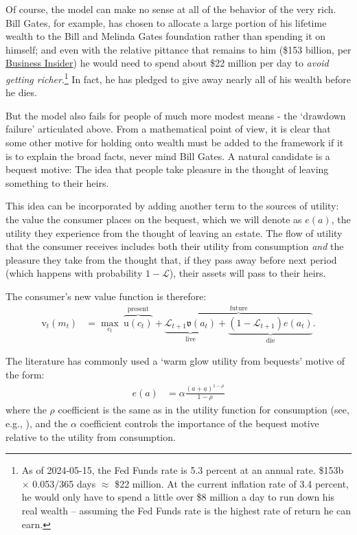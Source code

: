 \documentclass{article}
\newcommand{\CRRA}{\rho}
\newcommand{\uFunc}{\mathrm{u}}
\newcommand{\vFunc}{\mathrm{v}}
\newcommand{\Alive}{\mathcal{L}}
\newcommand{\cNrm}{c}
\newcommand{\aNrm}{a}
\newcommand{\mNrm}{m}
\newcommand{\bqstNrm}{e}
\begin{document}
Of course, the model can make no sense at all of the behavior of the very rich.
Bill Gates, for example, has chosen to allocate a large portion of his lifetime wealth to the Bill and Melinda Gates foundation rather than spending it on himself; and even with the relative pittance that remains to him (\$153 billion, per \href{https://www.businessinsider.com/how-bill-gates-spends-fortune}{Business Insider}) he would need to spend about \$22 million per day to \textit{avoid getting richer}.\footnote{As of 2024-05-15, the Fed Funds rate is 5.3 percent at an annual rate.
\$153b $\times$ 0.053/365 days $\approx$ \$22 million.
At the current inflation rate of 3.4 percent, he would only have to spend a little over \$8 million a day to run down his real wealth -- assuming the Fed Funds rate is the highest rate of return he can earn.}
In fact, he has pledged to give away nearly all of his wealth before he dies.

But the model also fails for people of much more modest means - the `drawdown failure' articulated above.
From a mathematical point of view, it is clear that some other motive for holding onto wealth must be added to the framework if it is to explain the broad facts, never mind Bill Gates.
A natural candidate is a bequest motive: The idea that people take pleasure in the thought of leaving something to their heirs.

This idea can be incorporated by adding another term to the sources of utility: the value the consumer places on the bequest, which we will denote as $\bqstNrm(\aNrm)$, the utility they experience from the thought of leaving an $\bqstNrm$state.
The flow of utility that the consumer receives includes both their utility from consumption \textit{and} the pleasure they take from the thought that, if they pass away before next period (which happens with probability $1 -\Alive$), their assets will pass to their heirs.

The consumer's new value function is therefore:
\begin{align}
    {\vFunc}_{t}({\mNrm}_{t}) & = \max_{\cNrm_{t}} ~ \overbrace{\uFunc(\cNrm_{t})}^{\text{present}}+\overbrace{\underbrace{\Alive_{t+1}\mathfrak{v}(\aNrm_{t})}_{\text{live}} + \underbrace{(1-\Alive_{t+1})\bqstNrm({\aNrm}_{t})}_{\text{die}}
    }^{\text{future}}.
\end{align}

The literature has commonly used a `warm glow utility from bequests' motive of the form:
\begin{align}
    \bqstNrm(a) & = \alpha\frac{(a+\underline{a})^{1-\CRRA}}{1-\CRRA}
\end{align}
where the $\CRRA$ coefficient is the same as in the utility function for consumption (see, e.g., \cite{deNardiBequest}), and the $\alpha$ coefficient controls the importance of the bequest motive relative to the utility from consumption.
\end{document}
